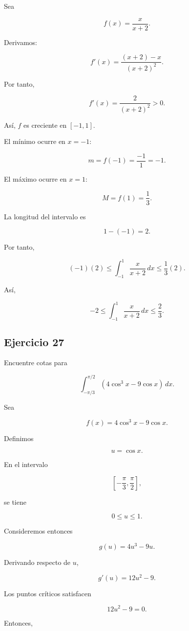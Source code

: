 \documentclass[12pt]{article}
\begin{document}
Sea

\[
f(x)=\frac{x}{x+2}.
\]

Derivamos:

\[
f'(x)
=
\frac{(x+2)-x}{(x+2)^2}.
\]

Por tanto,

\[
f'(x)
=
\frac{2}{(x+2)^2}>0.
\]

Así, \(f\) es creciente en \([-1,1]\).

El mínimo ocurre en \(x=-1\):

\[
m=f(-1)
=
\frac{-1}{1}
=
-1.
\]

El máximo ocurre en \(x=1\):

\[
M=f(1)
=
\frac13.
\]

La longitud del intervalo es

\[
1-(-1)=2.
\]

Por tanto,

\[
(-1)(2)
\leq
\int_{-1}^{1}\frac{x}{x+2}\,dx
\leq
\frac13(2).
\]

Así,

\[
\boxed{
-2
\leq
\int_{-1}^{1}\frac{x}{x+2}\,dx
\leq
\frac23
}.
\]

\subsection*{Ejercicio 27}

Encuentre cotas para

\[
\int_{-\pi/3}^{\pi/2}
\left(
4\cos^3x-9\cos x
\right)\,dx.
\]

Sea

\[
f(x)
=
4\cos^3x-9\cos x.
\]

Definimos

\[
u=\cos x.
\]

En el intervalo

\[
\left[-\frac{\pi}{3},\frac{\pi}{2}\right],
\]

se tiene

\[
0\leq u\leq1.
\]

Consideremos entonces

\[
g(u)=4u^3-9u.
\]

Derivando respecto de \(u\),

\[
g'(u)=12u^2-9.
\]

Los puntos críticos satisfacen

\[
12u^2-9=0.
\]

Entonces,
\end{document}
